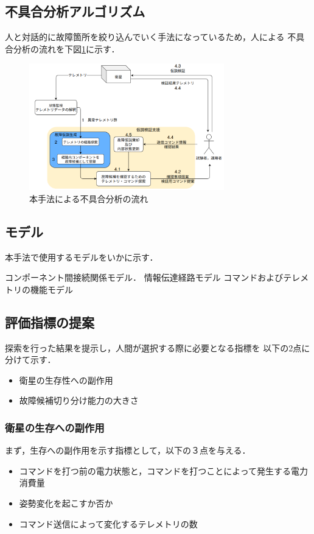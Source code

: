 \documentclass[11pt]{jsarticle}%
\begin{document}
\begin{multicols}{2}
\subsection{不具合分析アルゴリズム}
\vspace{-1zh}
人と対話的に故障箇所を絞り込んでいく手法になっているため，人による
不具合分析の流れを下図\ref{fig:fault_diagnosis_flow}に示す．
\begin{figure}[H]
  \centering
    \includegraphics[height=5.5cm]{../figure/fault_diagnosis_flow.png}
    \caption{本手法による不具合分析の流れ}
    \label{fig:fault_diagnosis_flow}
\end{figure}

\subsection{モデル}%
本手法で使用するモデルをいかに示す．

  コンポーネント間接続関係モデル．
  情報伝達経路モデル
  コマンドおよびテレメトリの機能モデル%

  \subsection{評価指標の提案}
  探索を行った結果を提示し，人間が選択する際に必要となる指標を
  以下の2点に分けて示す．
  \begin{itemize}
    \item 衛星の生存性への副作用
    \item 故障候補切り分け能力の大きさ
  \end{itemize}

  \subsubsection{衛星の生存への副作用}
  まず，生存への副作用を示す指標として，以下の３点を与える．
  \begin{itemize}
    \item コマンドを打つ前の電力状態と，コマンドを打つことによって発生する電力消費量
    \item 姿勢変化を起こすか否か
    \item コマンド送信によって変化するテレメトリの数
  \end{itemize}


\end{multicols}
\end{document}
